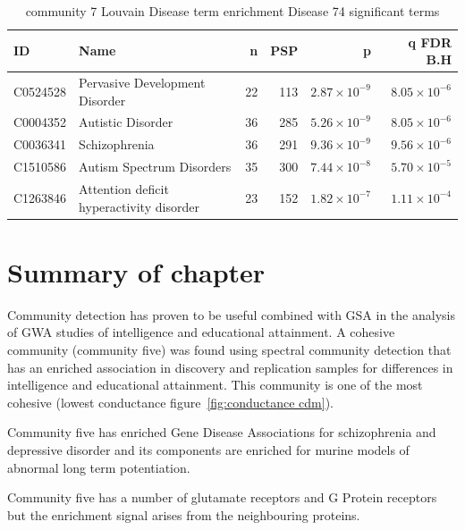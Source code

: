 \begin{table}[ht]
\centering
\begin{tabular}{llrrrr}
  \toprule
ID & Name & n &  PSP & p & q FDR B.H \\ 
  \midrule
C0524528 & Pervasive Development Disorder & 22 & 113 & $2.87 \times 10^{-9}$ & $8.05 \times 10^{-6}$ \\ 
  C0004352 & Autistic Disorder & 36 & 285 & $5.26 \times 10^{-9}$ & $8.05 \times 10^{-6}$ \\ 
  C0036341 & Schizophrenia & 36 & 291 & $9.36 \times 10^{-9}$ & $9.56 \times 10^{-6}$ \\ 
  C1510586 & Autism Spectrum Disorders & 35 & 300 & $7.44 \times 10^{-8}$ & $5.70 \times 10^{-5}$ \\ 
  C1263846 & Attention deficit hyperactivity disorder & 23 & 152 & $1.82 \times 10^{-7}$ & $1.11 \times 10^{-4}$ \\ 
   \bottomrule
\end{tabular}
\caption{community 7 Louvain Disease term enrichment Disease 74 significant terms} 
\label{tab:Group 7 Disease 74 significant terms}
\end{table}


\clearpage

\section{Summary of chapter}

Community detection has proven to be useful combined with GSA in the analysis of GWA studies of intelligence and educational attainment. A cohesive community (community five) was found using spectral community detection that has an enriched association in discovery and replication samples for differences in intelligence and educational attainment. This community is one of the most cohesive (lowest conductance figure~\ref{fig:conductance cdm}).

Community five has enriched Gene Disease Associations for schizophrenia and depressive disorder and its components are enriched for murine models of abnormal long term potentiation. 

Community five has a number of glutamate receptors and G Protein receptors but the enrichment signal arises from the neighbouring proteins. 




